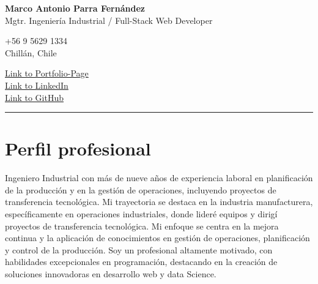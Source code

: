 \documentclass[a4paper,10pt]{article}
\newcommand{\mediumfont}{\fontsize{12pt}{14pt}\selectfont}
\begin{document}
	
	\pagestyle{fancy}


	
	\begin{center}
				\textbf{\LARGE Marco Antonio Parra Fernández} \\
			    {\mediumfont Mgtr. Ingeniería Industrial / Full-Stack Web Developer} \\

				\begin{minipage}[t]{0.45\textwidth}
					\small +56 9 5629 1334 \\
					\small Chillán, Chile \\
				\end{minipage}%
				\hfill
				\begin{minipage}[t]{0.45\textwidth}
					\raggedleft
        			\small \href{https://portfolio-mparraf.herokuapp.com}{Link to Portfolio-Page} \\
					\small \href{https://www.linkedin.com/in/marco-antonio-parra-82999337/}{Link to LinkedIn} \\
					\small \href{https://www.github.com/maaferna}{Link to GitHub}
				\end{minipage}
				\vspace{10pt} %
				\hrule
				\vspace{10pt} %

	\end{center}
	
	\section*{Perfil profesional}
	\small
Ingeniero Industrial con más de nueve años de experiencia laboral en planificación de la producción y en la gestión de operaciones, incluyendo proyectos de transferencia tecnológica. Mi trayectoria se destaca en la industria manufacturera, específicamente en operaciones industriales, donde lideré equipos y dirigí proyectos de transferencia tecnológica. Mi enfoque se centra en la mejora continua y la aplicación de conocimientos en gestión de operaciones, planificación y control de la producción. Soy un profesional altamente motivado, con habilidades excepcionales en programación, destacando en la creación de soluciones innovadoras en desarrollo web y data Science.
\end{document}
